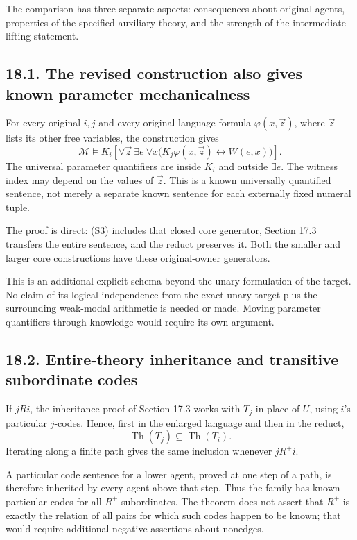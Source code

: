 \documentclass[
  11pt,
  letterpaper,
]{article}
\newcounter{none} %
\begin{document}
The comparison has three separate aspects: consequences about original
agents, properties of the specified auxiliary theory, and the strength
of the intermediate lifting statement.

\subsection{18.1. The revised construction also gives known parameter
mechanicalness}\label{the-revised-construction-also-gives-known-parameter-mechanicalness}

For every original \(i,j\) and every original-language formula
\(\varphi(x,\vec z)\), where \(\vec z\) lists its other free variables,
the construction gives \[
\mathcal M\models
K_i\left[
\forall\vec z\ \exists e\ \forall x
 \bigl(K_j\varphi(x,\vec z)\leftrightarrow W(e,x)\bigr)
\right].
\tag{P1}
\] The universal parameter quantifiers are inside \(K_i\) and outside
\(\exists e\). The witness index may depend on the values of \(\vec z\).
This is a known universally quantified sentence, not merely a separate
known sentence for each externally fixed numeral tuple.

The proof is direct: (S3) includes that closed core generator, Section
17.3 transfers the entire sentence, and the reduct preserves it. Both
the smaller and larger core constructions have these original-owner
generators.

This is an additional explicit schema beyond the unary formulation of
the target. No claim of its logical independence from the exact unary
target plus the surrounding weak-modal arithmetic is needed or made.
Moving parameter quantifiers through knowledge would require its own
argument.

\subsection{18.2. Entire-theory inheritance and transitive subordinate
codes}\label{entire-theory-inheritance-and-transitive-subordinate-codes}

If \(jRi\), the inheritance proof of Section 17.3 works with \(T_j\) in
place of \(U\), using \(i\)'s particular \(j\)-codes. Hence, first in
the enlarged language and then in the reduct, \[
\operatorname{Th}(T_j)\subseteq\operatorname{Th}(T_i).
\tag{P2}
\] Iterating along a finite path gives the same inclusion whenever
\(jR^+i\).

A particular code sentence for a lower agent, proved at one step of a
path, is therefore inherited by every agent above that step. Thus the
family has known particular codes for all \(R^+\)-subordinates. The
theorem does not assert that \(R^+\) is exactly the relation of all
pairs for which such codes happen to be known; that would require
additional negative assertions about nonedges.
\end{document}

